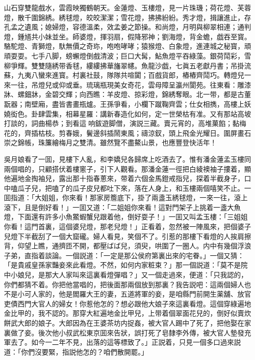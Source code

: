 \begin{myquote}
山石穿雙龍戲水，雲霞映獨鶴朝天。金蓮燈、玉樓燈，見一片珠璣；荷花燈、芙蓉燈，散千圍錦綉。綉毬燈，皎皎潔潔；雪花燈，拂拂紛紛。秀才燈，揖讓進止，存孔孟之遺風；媳婦燈，容德溫柔，效孟姜之節操。和尚燈，月明與柳翠相連；通判燈，鍾馗共小妹並坐。師婆燈，揮羽扇，假降邪神；劉海燈，背金蟾，戯吞至寳。駱駝燈、青獅燈，馱無價之奇珎，咆咆哮哮；猿猴燈、白象燈，進連城之秘寳，頑頑耍耍。七手八脚，螃蠏燈倒戲清波；巨口大髯，鮎魚燈平吞綠藻。銀荷鬦彩，雪柳爭輝。雙雙隨綉带香毬，縷縷拂華旛翠幰。魚龍沙戯，七眞五老獻丹書；吊掛流蘇，九夷八蠻來進寳。村裏社鼓，隊隊共喧闐；百戲貨郎，樁樁齊鬦巧。轉燈兒一來一往，吊燈兒或仰或垂。琉璃瓶現美女奇花，雲母障呈瀛州閬苑。往東看：雕漆牀、螺鈿牀，金碧交輝；向西瞧：羊皮燈、掠彩燈，錦綉奪眼。北一带，都是古董翫器；南壁廂，盡皆書畫瓶爐。王孫爭看，小欄下蹴鞠齊雲；仕女相擕，高樓上妖嬈衒色。卦肆雲集，相幕星羅：講新春造化如何，定一世榮枯有准。又有那站高坡打談的，詞曲楊恭；到看這𢵞响鈸遊脚僧，演説三藏。賣元宵的，高堆菓餡；黏梅花的，齊插枯枝。剪春娥，鬢邊斜插鬧東風；禱涼釵，頭上飛金光耀日。圍屏畫石崇之錦帳，珠簾繪梅月之雙清。雖然覽不盡鰲山景，也應豐登快活年！
\end{myquote}

吳月娘看了一囬，見樓下人亂，和李嬌兒各歸席上吃酒去了。惟有潘金蓮孟玉樓同兩個唱的，只顧搭伏着樓窻子，引下人觀看。那潘金蓮一徑把白綾襖袖子摟着，顯他遍地金掏袖兒，露出那十指春蔥來，带着六個金馬鐙戒指兒，探着半截身子，口中嗑瓜子兒，把嗑了的瓜子皮兒都吐下來，落在人身上，和玉樓兩個嘻笑不止。一囬指道：「大姐姐，你來看！那家房簷底下，掛了兩盞玉綉毬燈，一來一往，滾上滾下，且是倒好看！」一囬又道：「二姐姐你來看！這對門架子上挑着一盞大魚燈，下面還有許多小魚鱉蝦蟹兒跟着他，倒好耍子！」一囬又叫孟玉樓：「三姐姐你看！這門首裏，這個婆兒燈，那老兒燈！」正看着，忽然被一陣風來，把個婆子兒燈下半截刮了一個大窟礲。婦人看見，笑個不了。引惹的那樓下看燈的人挨肩擦背，仰望上瞧，通擠匝不開，都壓ばば兒，須臾，哄圍了一圈人。内中有幾個浮浪子弟，直指着談論。一個説道：「一定是那公侯府第裏出來的宅眷。」一個又猜：「是貴戚皇孫家豔妾來此看燈。不然，如何内家粧束？」那一個説道：「莫不是院中小娘兒，是那大人家叫來這裏看燈彈唱？」又一個走過來，便道：「只我認的，你們都猜不着。你把他當唱的，把後面那兩個放到那裏？我告説吧：這兩個婦人也不是小可人家的，他是閻羅大王的妻，五道將軍的妾，是咱縣門前開生薬舖、放官吏債西門大官人的婦女！你惹他怎的？想必跟他大娘子來這裏看燈。這個穿綠遍地金比甲的，我不認的。那穿大紅遍地金比甲兒，上带着個翠面花兒的，倒好似賣炊餅武大郎的娘子。大郎因為在王婆茶坊内捉姦，被大官人踢中了死了，把他娶在家裏做了妾。後次他小叔武松東京囬來告狀，誤打死了皂隸李外傳，被大官人墊發充軍去了。如今一二年不見，出落的這等標致了。」正説着，只見一個多口過來説道：「你們沒要緊，指説他怎的？咱們散開罷。」

